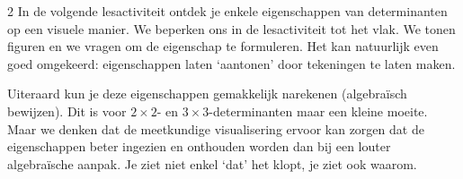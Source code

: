 \begin{multicols}{2}
In de volgende lesactiviteit ontdek je enkele eigenschappen van determinanten op een visuele manier. We beperken ons in de lesactiviteit tot het vlak. We tonen figuren en we vragen om de eigenschap te formuleren. Het kan natuurlijk even goed omgekeerd: eigenschappen laten `aantonen' door tekeningen te laten maken.

Uiteraard kun je deze eigenschappen gemakkelijk narekenen (algebraïsch bewijzen). Dit is voor $2\times 2$- en $3\times 3$-determinanten maar een kleine moeite. Maar we denken dat de meetkundige visualisering ervoor kan zorgen dat de eigenschappen beter ingezien en onthouden worden dan bij een louter algebraïsche aanpak. Je ziet niet enkel `dat' het klopt, je ziet ook waarom.
    
\end{multicols}

